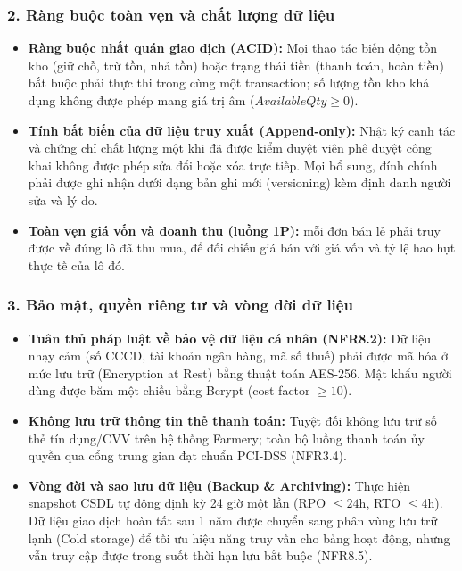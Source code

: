 \subsubsection*{2. Ràng buộc toàn vẹn và chất lượng dữ liệu}
\begin{itemize}
    \item \textbf{Ràng buộc nhất quán giao dịch (ACID):} Mọi thao tác biến động tồn kho (giữ chỗ, trừ tồn, nhả tồn) hoặc trạng thái tiền (thanh toán, hoàn tiền) bắt buộc phải thực thi trong cùng một transaction; số lượng tồn kho khả dụng không được phép mang giá trị âm ($AvailableQty \ge 0$).
    \item \textbf{Tính bất biến của dữ liệu truy xuất (Append-only):} Nhật ký canh tác và chứng chỉ chất lượng một khi đã được kiểm duyệt viên phê duyệt công khai không được phép sửa đổi hoặc xóa trực tiếp. Mọi bổ sung, đính chính phải được ghi nhận dưới dạng bản ghi mới (versioning) kèm định danh người sửa và lý do.
    \item \textbf{Toàn vẹn giá vốn và doanh thu (luồng 1P):} mỗi đơn bán lẻ phải truy được về đúng lô đã thu mua, để đối chiếu giá bán với giá vốn và tỷ lệ hao hụt thực tế của lô đó.
\end{itemize}

\subsubsection*{3. Bảo mật, quyền riêng tư và vòng đời dữ liệu}
\begin{itemize}
    \item \textbf{Tuân thủ pháp luật về bảo vệ dữ liệu cá nhân (NFR8.2):} Dữ liệu nhạy cảm (số CCCD, tài khoản ngân hàng, mã số thuế) phải được mã hóa ở mức lưu trữ (Encryption at Rest) bằng thuật toán AES-256. Mật khẩu người dùng được băm một chiều bằng Bcrypt (cost factor $\ge 10$).
    \item \textbf{Không lưu trữ thông tin thẻ thanh toán:} Tuyệt đối không lưu trữ số thẻ tín dụng/CVV trên hệ thống Farmery; toàn bộ luồng thanh toán ủy quyền qua cổng trung gian đạt chuẩn PCI-DSS (NFR3.4).
    \item \textbf{Vòng đời và sao lưu dữ liệu (Backup \& Archiving):} Thực hiện snapshot CSDL tự động định kỳ 24 giờ một lần (RPO $\le 24$h, RTO $\le 4$h). Dữ liệu giao dịch hoàn tất sau 1 năm được chuyển sang phân vùng lưu trữ lạnh (Cold storage) để tối ưu hiệu năng truy vấn cho bảng hoạt động, nhưng vẫn truy cập được trong suốt thời hạn lưu bắt buộc (NFR8.5).
\end{itemize}

